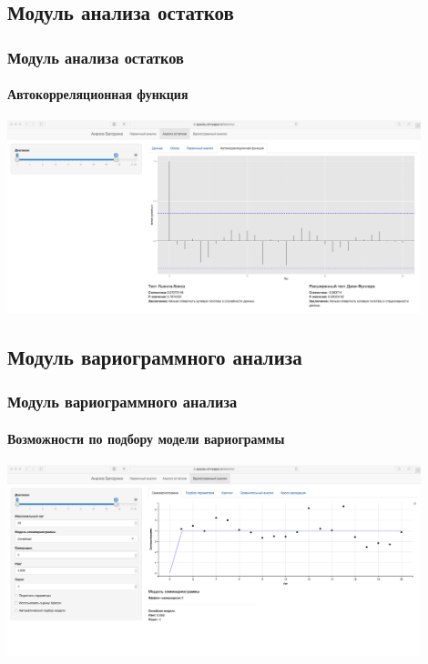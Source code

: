 \documentclass{beamer}
\begin{document}
\subsection{Модуль анализа остатков}
\begin{frame}
  \frametitle{Модуль анализа остатков}
  \framesubtitle{Автокорреляционная функция}
  \begin{center}
    \includegraphics[width=0.9\textwidth]{../../figures/static/3_acf.png}
  \end{center}
\end{frame}

\subsection{Модуль вариограммного анализа}
\begin{frame}
  \frametitle{Модуль вариограммного анализа}
  \framesubtitle{Возможности по подбору модели вариограммы}
  \begin{center}
    \includegraphics[width=0.9\textwidth]{../../figures/static/4_variogram.png}
  \end{center}
\end{frame}
\end{document}
